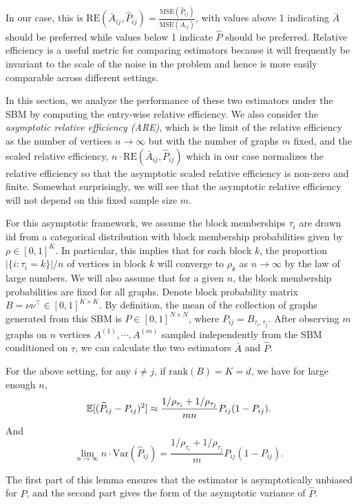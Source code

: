 In our case, this is $\mathrm{RE}(\bar{A}_{ij},\hat{P}_{ij}) = \frac{\mathrm{MSE}(\hat{P}_{ij})}{\mathrm{MSE}(\bar{A}_{ij})}$, with values above 1 indicating $\bar{A}$ should be preferred while values below 1 indicate $\hat{P}$ should be preferred.
Relative efficiency is a useful metric for comparing estimators because it will frequently be invariant to the scale of the noise in the problem and hence is more easily comparable across different settings.

In this section, we analyze the performance of these two estimators under the SBM by computing the entry-wise relative efficiency. 
We also consider the {\em{asymptotic relative efficiency (ARE)}}, which is the limit of the relative efficiency as the number of vertices $n \to\infty$ but with the number of graphs $m$ fixed, and the scaled relative efficiency, $n \cdot \mathrm{RE}(\bar{A}_{ij},\hat{P}_{ij}) $ which in our case normalizes the relative efficiency so that the asymptotic scaled relative efficiency is non-zero and finite. Somewhat surprisingly, we will see that the asymptotic relative efficiency will not depend on this fixed sample size $m$.

For this asymptotic framework, we assume the block memberships $\tau_i$ are drawn iid from a categorical distribution with block membership probabilities given by $\rho\in[0,1]^K$.
In particular, this implies that for each block $k$, the proportion $|\{i:\tau_i=k\}|/n$ of vertices in block $k$ will converge to $\rho_k$ as $n \to\infty$ by the law of large numbers.
We will also assume that for a given $n$, the block membership probabilities are fixed for all graphs.
Denote block probability matrix $B = \nu \nu^{\top} \in [0, 1]^{K \times K}$. 
By definition, the mean of the collection of graphs generated from this SBM is $P \in [0, 1]^{N \times N}$, where $P_{ij} = B_{\tau_i, \tau_j}$. After observing $m$ graphs on $n$ vertices $A^{(1)}, \cdots, A^{(m)}$ sampled independently from the SBM conditioned on $\tau$, we can calculate the two estimators $\bar{A}$ and $\hat{P}$.

\begin{lemma}
\label{lm:VarPhat}
For the above setting, for any $i \ne j$, if $\mathrm{rank}(B)=K=d$, we have for large enough $n$,
\[
    \mathbb{E}[(\widehat{P}_{ij} - P_{ij})^2] \approx
    \frac{1/\rho_{\tau_i} + 1/\rho_{\tau_j}}{m n} P_{ij}(1-P_{ij}).
\]
And
\[
    \lim_{n \to \infty} n \cdot \mathrm{Var}(\hat{P}_{ij}) =
    \frac{1/\rho_{\tau_i} + 1/\rho_{\tau_j}}{m} P_{ij} (1 - P_{ij}).
\]
\end{lemma}
The first part of this lemma ensures that the estimator is asymptotically unbiased for $P$,
and the second part gives the form of the asymptotic variance of $\hat{P}$.

